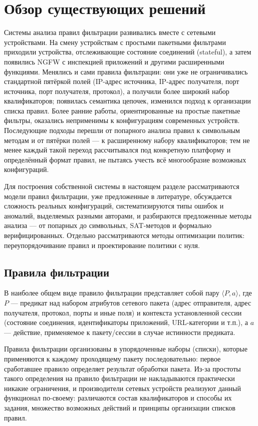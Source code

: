 \section{Обзор существующих решений}
\label{sec:Section2} 

Системы анализа правил фильтрации развивались вместе с сетевыми устройствами. На смену устройствам с простыми пакетными фильтрами приходили устройства, отслеживающие состояние соединений (stateful), а затем появились NGFW с инспекцией приложений и другими расширенными функциями. Менялись и сами правила фильтрации: они уже не ограничивались стандартной пятёркой полей (IP-адрес источника, IP-адрес получателя, порт источника, порт получателя, протокол), а получили более широкий набор квалификаторов; появилась семантика цепочек, изменился подход к организации списка правил. Более ранние работы, ориентированные на простые пакетные фильтры, оказались неприменимы к конфигурациям современных устройств. Последующие подходы перешли от попарного анализа правил к символьным методам и от пятёрки полей --- к расширенному набору квалификаторов; тем не менее каждый такой переход рассчитывался под конкретную платформу и определённый формат правил, не пытаясь учесть всё многообразие возможных конфигураций.

Для построения собственной системы в настоящем разделе рассматриваются модели правил фильтрации, уже предложенные в литературе, обсуждается сложность реальных конфигураций, систематизируются типы ошибок и аномалий, выделяемых разными авторами, и разбираются предложенные методы анализа --- от попарных до символьных, SAT-методов и формально верифицированных. Отдельно рассматриваются методы оптимизации политик: переупорядочивание правил и проектирование политики с нуля.

\subsection{Правила фильтрации}
\label{sec:Section2:rules}

В наиболее общем виде правило фильтрации представляет собой пару $\langle P, a\rangle$, где $P$ --- предикат над набором атрибутов сетевого пакета (адрес отправителя, адрес получателя, протокол, порты и иные поля) и контекста установленной сессии (состояние соединения, идентификаторы приложений, URL-категории и т.п.), а $a$ --- действие, применяемое к пакету/сессии в случае истинности предиката.

Правила фильтрации организованы в упорядоченные наборы (списки), которые применяются к каждому проходящему пакету последовательно: первое сработавшее правило определяет результат обработки пакета. Из-за простоты такого определения на правило фильтрации не накладываются практически никакие ограничения, и производители сетевых устройств реализуют данный функционал по-своему: различаются состав квалификаторов и способы их задания, множество возможных действий и принципы организации списков правил.


